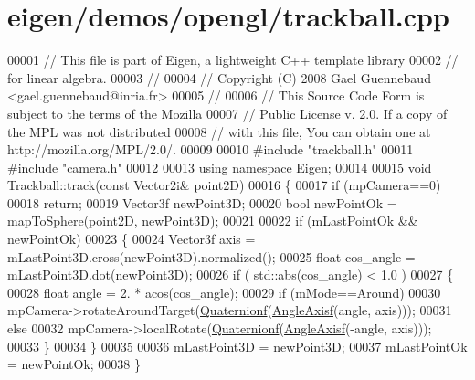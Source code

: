 \hypertarget{eigen_2demos_2opengl_2trackball_8cpp_source}{}\section{eigen/demos/opengl/trackball.cpp}
\label{eigen_2demos_2opengl_2trackball_8cpp_source}

\begin{DoxyCode}
00001 \textcolor{comment}{// This file is part of Eigen, a lightweight C++ template library}
00002 \textcolor{comment}{// for linear algebra.}
00003 \textcolor{comment}{//}
00004 \textcolor{comment}{// Copyright (C) 2008 Gael Guennebaud <gael.guennebaud@inria.fr>}
00005 \textcolor{comment}{//}
00006 \textcolor{comment}{// This Source Code Form is subject to the terms of the Mozilla}
00007 \textcolor{comment}{// Public License v. 2.0. If a copy of the MPL was not distributed}
00008 \textcolor{comment}{// with this file, You can obtain one at http://mozilla.org/MPL/2.0/.}
00009 
00010 \textcolor{preprocessor}{#include "trackball.h"}
00011 \textcolor{preprocessor}{#include "camera.h"}
00012 
00013 \textcolor{keyword}{using namespace }\hyperlink{namespace_eigen}{Eigen};
00014 
00015 \textcolor{keywordtype}{void} Trackball::track(\textcolor{keyword}{const} Vector2i& point2D)
00016 \{
00017   \textcolor{keywordflow}{if} (mpCamera==0)
00018     \textcolor{keywordflow}{return};
00019   Vector3f newPoint3D;
00020   \textcolor{keywordtype}{bool} newPointOk = mapToSphere(point2D, newPoint3D);
00021 
00022   \textcolor{keywordflow}{if} (mLastPointOk && newPointOk)
00023   \{
00024     Vector3f axis = mLastPoint3D.cross(newPoint3D).normalized();
00025     \textcolor{keywordtype}{float} cos\_angle = mLastPoint3D.dot(newPoint3D);
00026     \textcolor{keywordflow}{if} ( std::abs(cos\_angle) < 1.0 )
00027     \{
00028       \textcolor{keywordtype}{float} angle = 2. * acos(cos\_angle);
00029       \textcolor{keywordflow}{if} (mMode==Around)
00030         mpCamera->rotateAroundTarget(\hyperlink{group___geometry___module_ga785b13a5a87f9bf55d4eba51ead2dcf0}{Quaternionf}(\hyperlink{group___geometry___module_gadc7128416da41ca99bb8af814b78599e}{AngleAxisf}(angle, axis)));
00031       \textcolor{keywordflow}{else}
00032         mpCamera->localRotate(\hyperlink{group___geometry___module_ga785b13a5a87f9bf55d4eba51ead2dcf0}{Quaternionf}(\hyperlink{group___geometry___module_gadc7128416da41ca99bb8af814b78599e}{AngleAxisf}(-angle, axis)));
00033     \}
00034   \}
00035 
00036   mLastPoint3D = newPoint3D;
00037   mLastPointOk = newPointOk;
00038 \}

\end{DoxyCode}
